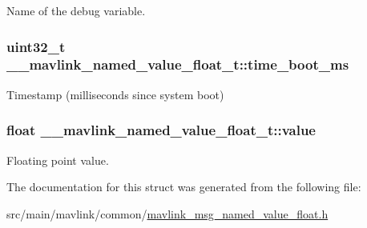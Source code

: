 Name of the debug variable. 

\hypertarget{struct____mavlink__named__value__float__t_a46e6c60e5c779ce8f3e808c485aa620f}{
\subsubsection[{time\+\_\+boot\+\_\+ms}]{\setlength{\rightskip}{0pt plus 5cm}uint32\+\_\+t \+\_\+\+\_\+mavlink\+\_\+named\+\_\+value\+\_\+float\+\_\+t\+::time\+\_\+boot\+\_\+ms}}\label{struct____mavlink__named__value__float__t_a46e6c60e5c779ce8f3e808c485aa620f}


Timestamp (milliseconds since system boot) 

\hypertarget{struct____mavlink__named__value__float__t_a44c8c857d4e8732bccb9ef9ed1e2a386}{
\subsubsection[{value}]{\setlength{\rightskip}{0pt plus 5cm}float \+\_\+\+\_\+mavlink\+\_\+named\+\_\+value\+\_\+float\+\_\+t\+::value}}\label{struct____mavlink__named__value__float__t_a44c8c857d4e8732bccb9ef9ed1e2a386}


Floating point value. 



The documentation for this struct was generated from the following file\+:\begin{DoxyCompactItemize}
\item 
src/main/mavlink/common/\hyperlink{mavlink__msg__named__value__float_8h}{mavlink\+\_\+msg\+\_\+named\+\_\+value\+\_\+float.\+h}\end{DoxyCompactItemize}
